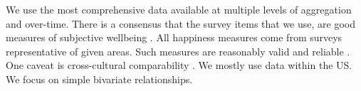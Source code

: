 \documentclass[10pt, letterpaper]{article}
\begin{document}
\begin{spacing}{1.5}





We use the most comprehensive data available at multiple levels of aggregation
and over-time. There is a consensus that the survey items that we use, are good
measures of subjective wellbeing \citep{diener09,oswald09w,stiglitz09al}.
 All happiness measures come from surveys representative of given areas. Such measures are reasonably valid and
reliable \citep{diener13b}. %
One caveat is cross-cultural comparability \citep{diener03b}. %
 We mostly use data within the US. %
We focus on simple bivariate relationships. %




\end{spacing}
\end{document}
